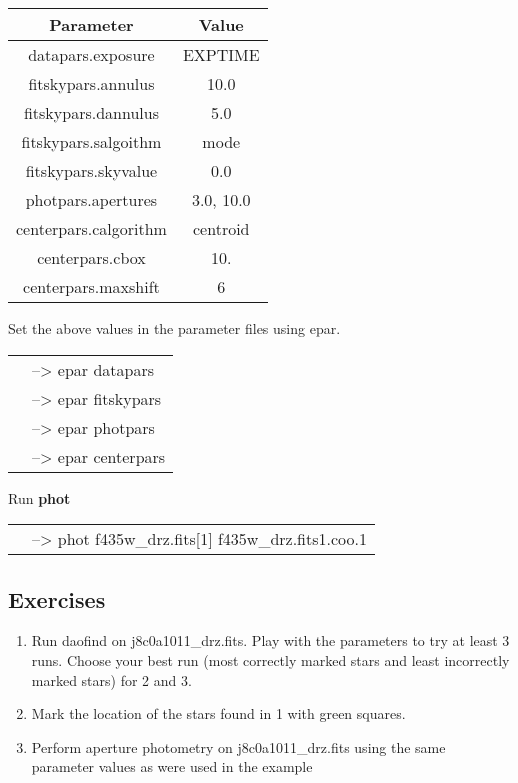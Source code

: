\begin{minipage}{5.0in}

\begin{center}
\begin{tabular}{|c|c|}
\hline
Parameter & Value\\
\hline \hline
datapars.exposure&EXPTIME\\
\hline
fitskypars.annulus&10.0\\
\hline
fitskypars.dannulus&5.0\\
\hline
fitskypars.salgoithm&mode\\
\hline
fitskypars.skyvalue&0.0\\
\hline
photpars.apertures&3.0, 10.0\\
\hline
centerpars.calgorithm&centroid\\
\hline
centerpars.cbox& 10.\\
\hline
centerpars.maxshift&6\\
\hline
\end{tabular}
\end{center}
Set the above values in the parameter files using epar. \\
\begin{tabular}{ll}
& {\color{RoyalBlue}--> epar datapars} \\
& {\color{RoyalBlue}--> epar fitskypars} \\
& {\color{RoyalBlue}--> epar photpars }\\
& {\color{RoyalBlue}--> epar centerpars } \\
\end{tabular}

Run {\bf phot} \\

\begin{tabular}{ll}
& {\color{RoyalBlue}--> phot f435w\_drz.fits[1] f435w\_drz.fits1.coo.1 } \\
\end{tabular}
\end{minipage}



\subsection{Exercises}
\begin{enumerate}
\item Run daofind on j8c0a1011\_drz.fits. Play with the parameters to try at least 3 runs. Choose your best run (most correctly marked stars and least incorrectly marked stars) for 2 and 3.
\item Mark the location of the stars found in 1 with green squares.
\item Perform aperture photometry on j8c0a1011\_drz.fits using the same parameter values as were used in the example
\end{enumerate}

